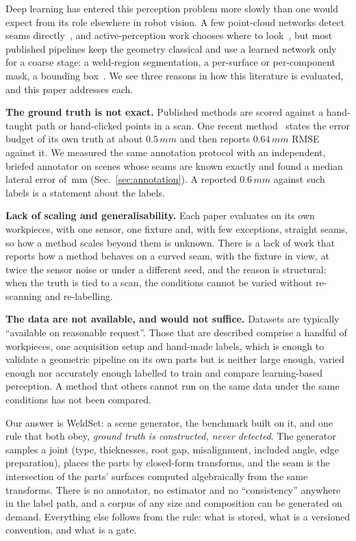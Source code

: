 \documentclass[letterpaper, 10 pt, conference]{ieeeconf}
\newcommand{\mm}{\,mm}
\begin{document}
Deep learning has entered this perception problem more slowly than one would expect from its role elsewhere in robot vision. A few point-cloud networks detect seams directly~\cite{wang2024weldnet,song2025lwsnet,zhu2025sanet}, and active-perception work chooses where to look~\cite{tao2026paear}, but most published pipelines keep the geometry classical and use a learned network only for a coarse stage: a weld-region segmentation, a per-surface or per-component mask, a bounding box~\cite{yi2026seam,wei2024coarse,zhang2025lobb,wang2024ppf,wang2026pipe}. We see three reasons in how this literature is evaluated, and this paper addresses each.

\textbf{The ground truth is not exact.} Published methods are scored against a hand-taught path or hand-clicked points in a scan. One recent method~\cite{yi2026seam} states the error budget of its own truth at about $0.5\mm$ and then reports $0.64\mm$ RMSE against it. We measured the same annotation protocol with an independent, briefed annotator on scenes whose seams are known exactly and found a median lateral error of \annMedian\mm{} (Sec.~\ref{sec:annotation}). A reported $0.6\mm$ against such labels is a statement about the labels.

\textbf{Lack of scaling and generalisability.} Each paper evaluates on its own workpieces, with one sensor, one fixture and, with few exceptions, straight seams, so how a method scales beyond them is unknown. There is a lack of work that reports how a method behaves on a curved seam, with the fixture in view, at twice the sensor noise or under a different seed, and the reason is structural: when the truth is tied to a scan, the conditions cannot be varied without re-scanning and re-labelling.

\textbf{The data are not available, and would not suffice.} Datasets are typically ``available on reasonable request''. Those that are described comprise a handful of workpieces, one acquisition setup and hand-made labels, which is enough to validate a geometric pipeline on its own parts but is neither large enough, varied enough nor accurately enough labelled to train and compare learning-based perception. A method that others cannot run on the same data under the same conditions has not been compared.

Our answer is WeldSet: a scene generator, the benchmark built on it, and one rule that both obey, \emph{ground truth is constructed, never detected}. The generator samples a joint (type, thicknesses, root gap, misalignment, included angle, edge preparation), places the parts by closed-form transforms, and the seam is the intersection of the parts' surfaces computed algebraically from the same transforms. There is no annotator, no estimator and no ``consistency'' anywhere in the label path, and a corpus of any size and composition can be generated on demand. Everything else follows from the rule: what is stored, what is a versioned convention, and what is a gate.
\end{document}
